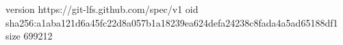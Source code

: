 version https://git-lfs.github.com/spec/v1
oid sha256:a1aba121d6a45fc22d8a057b1a18239ea624defa24238c8fada4a5ad65188df1
size 699212
